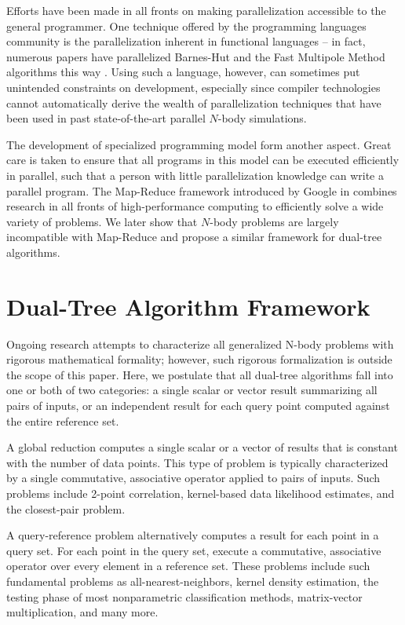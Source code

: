 \documentclass[times, leqno,twocolumn]{article}
\begin{document}
Efforts have been made in all fronts on making parallelization accessible to the general programmer.
One technique offered by the programming languages community is the parallelization inherent in functional languages -- in fact, numerous papers have parallelized Barnes-Hut and the Fast Multipole Method algorithms this way \cite{nesl, parallel_fmm}.
Using such a language, however, can sometimes put unintended constraints on development, especially since compiler technologies cannot automatically derive the wealth of parallelization techniques that have been used in past state-of-the-art parallel $N$-body simulations.

The development of specialized programming model form another aspect.
Great care is taken to ensure that all programs in this model can be executed efficiently in parallel, such that a person with little parallelization knowledge can write a parallel program.
The Map-Reduce framework introduced by Google in \cite{mapreduce} combines research in all fronts of high-performance computing to efficiently solve a wide variety of problems.
We later show that $N$-body problems are largely incompatible with Map-Reduce and propose a similar framework for dual-tree algorithms.

\section{Dual-Tree Algorithm Framework}



Ongoing research attempts to characterize all generalized N-body problems with rigorous mathematical formality; however, such rigorous formalization is outside the scope of this paper.
Here, we postulate that all dual-tree algorithms fall into one or both of two categories: a single scalar or vector result summarizing all pairs of inputs, or an independent result for each query point computed against the entire reference set.

A global reduction computes a single scalar or a vector of results that is constant with the number of data points.
This type of problem is typically characterized by a single commutative, associative operator applied to pairs of inputs.
Such problems include 2-point correlation, kernel-based data likelihood estimates, and the closest-pair problem.

A query-reference problem alternatively computes a result for each point in a query set.
For each point in the query set, execute a commutative, associative operator over every element in a reference set.
These problems include such fundamental problems as all-nearest-neighbors, kernel density estimation, the testing phase of most nonparametric classification methods, matrix-vector multiplication, and many more.
\end{document}
